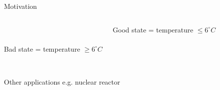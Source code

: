 \documentclass{beamer}
\begin{document}
\begin{frame}{Motivation}
\begin{columns}[T]
\phantom{Fridge.png} \\
\phantom{Fridge.png} \\
{\sf Bad} state = temperature $\geq 6^\circ C$ \newline

 {\sf Good} state = temperature $\leq 6^\circ C$ \\

\end{columns}

\pause

\phantom{Fridge.png} \\
Other applications e.g.  nuclear reactor 

  \end{frame}
\end{document}
